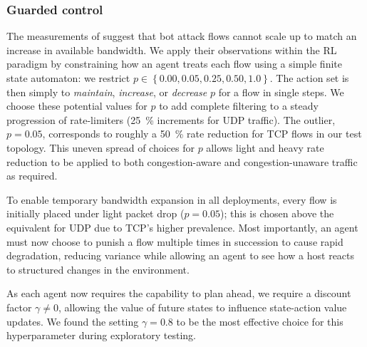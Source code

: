 \documentclass[10pt, times, comsoc]{IEEEtran}
\begin{document}
\subsubsection{Guarded control}
The measurements of \textcite{DBLP:conf/ndss/KangGS16} suggest that bot attack flows cannot scale up to match an increase in available bandwidth.
We apply their observations within the RL paradigm by constraining how an agent treats each flow using a simple finite state automaton: we restrict $p \in \left\{ 0.00, 0.05, 0.25, 0.50, 1.0 \right\}$.
The action set is then simply to \emph{maintain}, \emph{increase}, or \emph{decrease} $p$ for a flow in single steps.
We choose these potential values for $p$ to add complete filtering to a steady progression of rate-limiters (\SI{25}{\percent} increments for UDP traffic).
The outlier, $p=0.05$, corresponds to roughly a \SI{50}{\percent} rate reduction for TCP flows in our test topology.
This uneven spread of choices for $p$ allows light and heavy rate reduction to be applied to both congestion-aware and congestion-unaware traffic as required.

To enable temporary bandwidth expansion in all deployments, every flow is initially placed under light packet drop ($p=0.05$); this is chosen above the equivalent for UDP due to TCP's higher prevalence.
Most importantly, an agent must now choose to punish a flow multiple times in succession to cause rapid degradation, reducing variance while allowing an agent to see how a host reacts to structured changes in the environment.

As each agent now requires the capability to plan ahead, we require a discount factor $\gamma \ne 0$, allowing the value of future states to influence state-action value updates.
We found the setting $\gamma = 0.8$ to be the most effective choice for this hyperparameter during exploratory testing.
\end{document}
